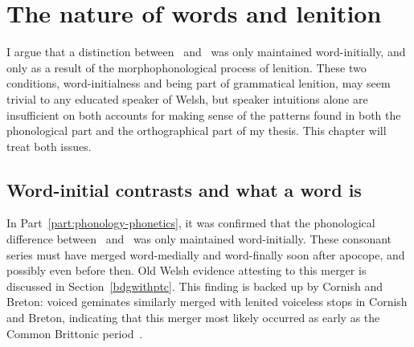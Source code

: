 \chapter{The nature of words and lenition}
\label{cha:some-phon-issu}
I argue that a distinction between \lT\ and \xD\ was only maintained word-initially, and only as a result of the morphophonological process of lenition. These two conditions, word-initialness and being part of grammatical lenition, may seem trivial to any educated speaker of Welsh, but speaker intuitions alone are insufficient on both accounts for making sense of the patterns found in both the phonological part and the orthographical part of my thesis. This chapter will treat both issues.

\section{Word-initial contrasts and what a word is}
\label{sec:excl-word-init}
In Part~\ref{part:phonology-phonetics}, it was confirmed that the phonological difference between \lT\ and \xD\ was only maintained word-initially. These consonant series must have merged word-medially and word-finally soon after apocope, and possibly even before then. Old Welsh evidence attesting to this merger is discussed in Section~\ref{bdgwithptc}. This finding is backed up by Cornish and Breton: voiced geminates similarly merged with lenited voiceless stops in Cornish and Breton, indicating that this merger most likely occurred as early as the Common Brittonic period~\autocite[31]{schrijver_old_2011}.



